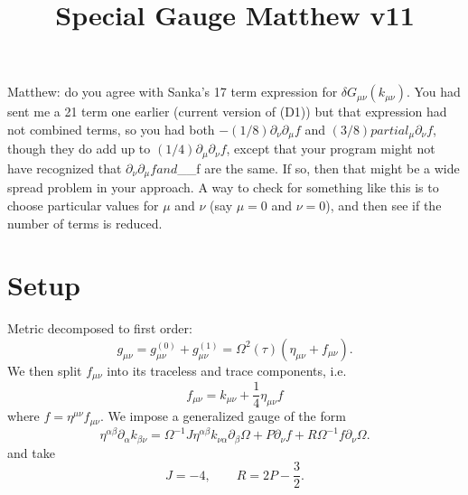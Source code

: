 \documentclass[10pt,letterpaper]{article}
\title{Special Gauge Matthew v11}
\date{}
\begin{document}
\maketitle
\noindent
Matthew: do you agree with Sanka's 17 term expression for $\delta G_{\mu\nu}(k_{\mu\nu})$. You had sent me a 21 term one earlier (current version of (D1)) but that expression had not combined terms, so you had  both $-(1/8)\partial_{\nu}\partial_{\mu}f$ and $(3/8)partial_{\mu}\partial_{\nu}f$, though they do add up to $(1/4)\partial_{\mu}\partial_{\nu}f$, except that your program might not have recognized that $\partial_{\nu}\partial_{\mu}f and $\partial_{\mu}\partial_{\nu}f are the same. If so, then that might be a wide spread problem in your approach. A way to check for something like this is to choose particular values for $\mu$ and $\nu$ (say $\mu=0$ and $\nu=0$),  and then see if the number of terms is reduced.
\section*{Setup}
Metric decomposed to first order:
\begin{equation}
g_{\mu\nu} = g^{(0)}_{\mu\nu} + g^{(1)}_{\mu\nu} = \Omega^2(\tau)(\eta_{\mu\nu}+f_{\mu\nu}).
\end{equation}
We then split $f_{\mu\nu}$ into its traceless and trace components, i.e.
\begin{equation}
	f_{\mu\nu} = k_{\mu\nu} + \frac 14 \eta_{\mu\nu}f
\end{equation}
where $f = \eta^{\mu\nu}f_{\mu\nu}$. 
We impose a generalized gauge of the form
\begin{equation}
	\eta^{\alpha\beta}\partial_{\alpha}k_{\beta\nu} = \Omega^{-1} J \eta^{\alpha\beta}k_{\nu\alpha}\partial_\beta \Omega + P \partial_\nu f + R \Omega^{-1} f \partial_\nu \Omega.
\end{equation}
 and take
\begin{equation}
	J=-4,\qquad R = 2P-\frac32.
\end{equation}
\\
\end{document}

